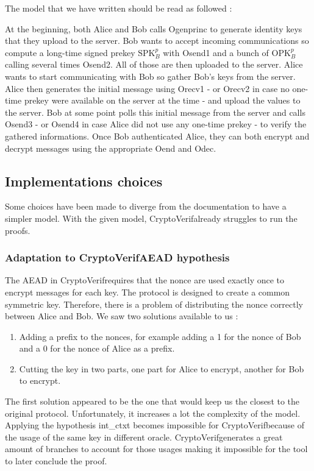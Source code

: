 \documentclass[a4paper, 10pt]{article}
\newcommand{\SPK}[2]{\textrm{SPK}_#1^#2}
\newcommand{\OPK}[2]{\textrm{OPK}_#1^#2}
\newcommand{\cv}{CryptoVerif}
\begin{document}
	The model that we have written should be read as followed :
	
	At the beginning, both Alice and Bob calls Ogenprinc to generate identity keys that they upload to the server. Bob wants to accept incoming communications so compute a long-time signed prekey $\SPK{B}{p}$ with Osend1 and a bunch of $\OPK{B}{p}$ calling several times Osend2. All of those are then uploaded to the server. Alice wants to start communicating with Bob so gather Bob's keys from the server. Alice then generates the initial message using Orecv1 - or Orecv2 in case no one-time prekey were available on the server at the time - and upload the values to the server. Bob at some point polls this initial message from the server and calls Osend3 - or Osend4 in case Alice did not use any one-time prekey - to verify the gathered informations. Once Bob authenticated Alice, they can both encrypt and decrypt messages using the appropriate Oend and Odec.
	
	\subsection{Implementations choices}
		Some choices have been made to diverge from the documentation to have a simpler model. With the given model, \cv already struggles to run the proofs.
		
		\subsubsection{Adaptation to \cv AEAD hypothesis}
		The AEAD in \cv requires that the nonce are used exactly once to encrypt messages for each key. The protocol is designed to create a common symmetric key. Therefore, there is a problem of distributing the nonce correctly between Alice and Bob. We saw two solutions available to us :
		\begin{enumerate}
			\item Adding a prefix to the nonces, for example adding a 1 for the nonce of Bob and a 0 for the nonce of Alice as a prefix.
			\item Cutting the key in two parts, one part for Alice to encrypt, another for Bob to encrypt.
		\end{enumerate}
		
		The first solution appeared to be the one that would keep us the closest to the original protocol. Unfortunately, it increases a lot the complexity of the model. Applying the hypothesis int\_ctxt becomes impossible for \cv because of the usage of the same key in different oracle. \cv generates a great amount of branches to account for those usages making it impossible for the tool to later conclude the proof.
		
\end{document}
